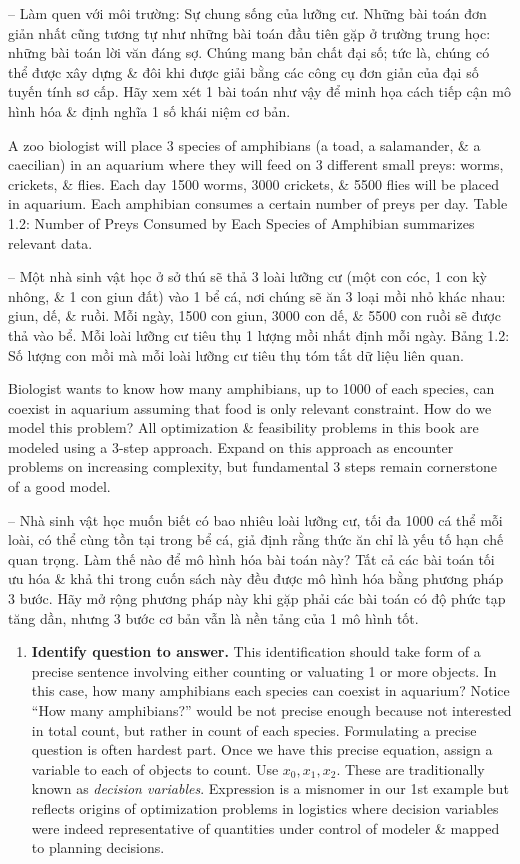 \documentclass{article}
\begin{document}
\begin{itemize}
\begin{itemize}
        -- {\sf Làm quen với môi trường: Sự chung sống của lưỡng cư.} Những bài toán đơn giản nhất cũng tương tự như những bài toán đầu tiên gặp ở trường trung học: những bài toán lời văn đáng sợ. Chúng mang bản chất đại số; tức là, chúng có thể được xây dựng \& đôi khi được giải bằng các công cụ đơn giản của đại số tuyến tính sơ cấp. Hãy xem xét 1 bài toán như vậy để minh họa cách tiếp cận mô hình hóa \& định nghĩa 1 số khái niệm cơ bản.

        A zoo biologist will place 3 species of amphibians (a toad, a salamander, \& a caecilian) in an aquarium where they will feed on 3 different small preys: worms, crickets, \& flies. Each day 1500 worms, 3000 crickets, \& 5500 flies will be placed in aquarium. Each amphibian consumes a certain number of preys per day. {\sf Table 1.2: Number of Preys Consumed by Each Species of Amphibian} summarizes relevant data.

        -- Một nhà sinh vật học ở sở thú sẽ thả 3 loài lưỡng cư (một con cóc, 1 con kỳ nhông, \& 1 con giun đất) vào 1 bể cá, nơi chúng sẽ ăn 3 loại mồi nhỏ khác nhau: giun, dế, \& ruồi. Mỗi ngày, 1500 con giun, 3000 con dế, \& 5500 con ruồi sẽ được thả vào bể. Mỗi loài lưỡng cư tiêu thụ 1 lượng mồi nhất định mỗi ngày. {\sf Bảng 1.2: Số lượng con mồi mà mỗi loài lưỡng cư tiêu thụ} tóm tắt dữ liệu liên quan.

        Biologist wants to know how many amphibians, up to 1000 of each species, can coexist in aquarium assuming that food is only relevant constraint. How do we model this problem? All optimization \& feasibility problems in this book are modeled using a 3-step approach. Expand on this approach as encounter problems on increasing complexity, but fundamental 3 steps remain cornerstone of a good model.

        -- Nhà sinh vật học muốn biết có bao nhiêu loài lưỡng cư, tối đa 1000 cá thể mỗi loài, có thể cùng tồn tại trong bể cá, giả định rằng thức ăn chỉ là yếu tố hạn chế quan trọng. Làm thế nào để mô hình hóa bài toán này? Tất cả các bài toán tối ưu hóa \& khả thi trong cuốn sách này đều được mô hình hóa bằng phương pháp 3 bước. Hãy mở rộng phương pháp này khi gặp phải các bài toán có độ phức tạp tăng dần, nhưng 3 bước cơ bản vẫn là nền tảng của 1 mô hình tốt.
        \begin{enumerate}
            \item {\bf Identify question to answer.} This identification should take form of a precise sentence involving either counting or valuating 1 or more objects. In this case, how many amphibians each species can coexist in aquarium? Notice ``How many amphibians?'' would be not precise enough because not interested in total count, but rather in count of each species. Formulating a precise question is often hardest part. Once we have this precise equation, assign a variable to each of objects to count. Use $x_0,x_1,x_2$. These are traditionally known as {\it decision variables}. Expression is a misnomer in our 1st example but reflects origins of optimization problems in logistics where decision variables were indeed representative of quantities under control of modeler \& mapped to planning decisions.


\end{enumerate}
\end{itemize}
\end{itemize}
\end{document}
